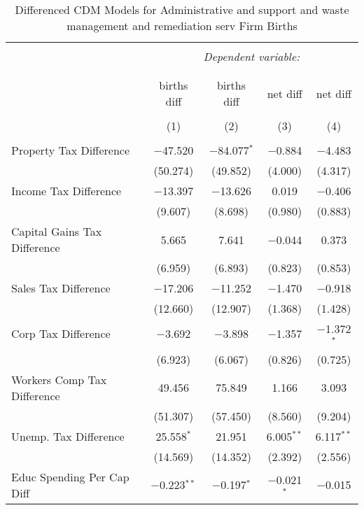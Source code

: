 
\begin{table}[!htbp] \centering 
  \caption{Differenced CDM Models for  Administrative and support and waste management and remediation serv Firm Births} 
  \label{} 
\begin{tabular}{@{\extracolsep{5pt}}lcccc} 
\\[-1.8ex]\hline 
\hline \\[-1.8ex] 
 & \multicolumn{4}{c}{\textit{Dependent variable:}} \\ 
\cline{2-5} 
\\[-1.8ex] & \multicolumn{4}{c}{ } \\ 
 & births diff & births diff & net diff & net diff \\ 
\\[-1.8ex] & (1) & (2) & (3) & (4)\\ 
\hline \\[-1.8ex] 
 Property Tax Difference & $-$47.520 & $-$84.077$^{*}$ & $-$0.884 & $-$4.483 \\ 
  & (50.274) & (49.852) & (4.000) & (4.317) \\ 
  Income Tax Difference & $-$13.397 & $-$13.626 & 0.019 & $-$0.406 \\ 
  & (9.607) & (8.698) & (0.980) & (0.883) \\ 
  Capital Gains Tax Difference & 5.665 & 7.641 & $-$0.044 & 0.373 \\ 
  & (6.959) & (6.893) & (0.823) & (0.853) \\ 
  Sales Tax Difference & $-$17.206 & $-$11.252 & $-$1.470 & $-$0.918 \\ 
  & (12.660) & (12.907) & (1.368) & (1.428) \\ 
  Corp Tax Difference & $-$3.692 & $-$3.898 & $-$1.357 & $-$1.372$^{*}$ \\ 
  & (6.923) & (6.067) & (0.826) & (0.725) \\ 
  Workers Comp Tax Difference & 49.456 & 75.849 & 1.166 & 3.093 \\ 
  & (51.307) & (57.450) & (8.560) & (9.204) \\ 
  Unemp. Tax Difference & 25.558$^{*}$ & 21.951 & 6.005$^{**}$ & 6.117$^{**}$ \\ 
  & (14.569) & (14.352) & (2.392) & (2.556) \\ 
  Educ Spending Per Cap Diff & $-$0.223$^{**}$ & $-$0.197$^{*}$ & $-$0.021$^{*}$ & $-$0.015 \\ 

\end{tabular}
\end{table}
